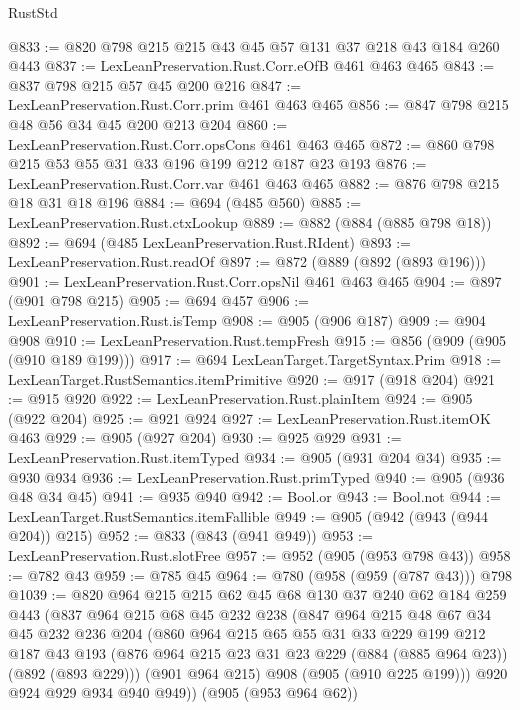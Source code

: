 \begin{lexlean}{RustStd}
\begin{coremodule}
@833 := @820 @798 @215 @215 @43 @45 @57 @131 @37 @218 @43 @184 @260 @443
@837 := LexLeanPreservation.Rust.Corr.eOfB @461 @463 @465
@843 := @837 @798 @215 @57 @45 @200 @216
@847 := LexLeanPreservation.Rust.Corr.prim @461 @463 @465
@856 := @847 @798 @215 @48 @56 @34 @45 @200 @213 @204
@860 := LexLeanPreservation.Rust.Corr.opsCons @461 @463 @465
@872 := @860 @798 @215 @53 @55 @31 @33 @196 @199 @212 @187 @23 @193
@876 := LexLeanPreservation.Rust.Corr.var @461 @463 @465
@882 := @876 @798 @215 @18 @31 @18 @196
@884 := @694 (@485 @560)
@885 := LexLeanPreservation.Rust.ctxLookup
@889 := @882 (@884 (@885 @798 @18))
@892 := @694 (@485 LexLeanPreservation.Rust.RIdent)
@893 := LexLeanPreservation.Rust.readOf
@897 := @872 (@889 (@892 (@893 @196)))
@901 := LexLeanPreservation.Rust.Corr.opsNil @461 @463 @465
@904 := @897 (@901 @798 @215)
@905 := @694 @457
@906 := LexLeanPreservation.Rust.isTemp
@908 := @905 (@906 @187)
@909 := @904 @908
@910 := LexLeanPreservation.Rust.tempFresh
@915 := @856 (@909 (@905 (@910 @189 @199)))
@917 := @694 LexLeanTarget.TargetSyntax.Prim
@918 := LexLeanTarget.RustSemantics.itemPrimitive
@920 := @917 (@918 @204)
@921 := @915 @920
@922 := LexLeanPreservation.Rust.plainItem
@924 := @905 (@922 @204)
@925 := @921 @924
@927 := LexLeanPreservation.Rust.itemOK @463
@929 := @905 (@927 @204)
@930 := @925 @929
@931 := LexLeanPreservation.Rust.itemTyped
@934 := @905 (@931 @204 @34)
@935 := @930 @934
@936 := LexLeanPreservation.Rust.primTyped
@940 := @905 (@936 @48 @34 @45)
@941 := @935 @940
@942 := Bool.or
@943 := Bool.not
@944 := LexLeanTarget.RustSemantics.itemFallible
@949 := @905 (@942 (@943 (@944 @204)) @215)
@952 := @833 (@843 (@941 @949))
@953 := LexLeanPreservation.Rust.slotFree
@957 := @952 (@905 (@953 @798 @43))
@958 := @782 @43
@959 := @785 @45
@964 := @780 (@958 (@959 (@787 @43))) @798
@1039 := @820
    @964
    @215
    @215
    @62
    @45
    @68
    @130
    @37
    @240
    @62
    @184
    @259
    @443
    (@837
      @964
      @215
      @68
      @45
      @232
      @238
      (@847
        @964
        @215
        @48
        @67
        @34
        @45
        @232
        @236
        @204
        (@860
          @964
          @215
          @65
          @55
          @31
          @33
          @229
          @199
          @212
          @187
          @43
          @193
          (@876 @964 @215 @23 @31 @23 @229 (@884 (@885 @964 @23)) (@892 (@893 @229)))
          (@901 @964 @215)
          @908
          (@905 (@910 @225 @199)))
        @920
        @924
        @929
        @934
        @940
        @949))
    (@905 (@953 @964 @62))

\end{coremodule}
\end{lexlean}
